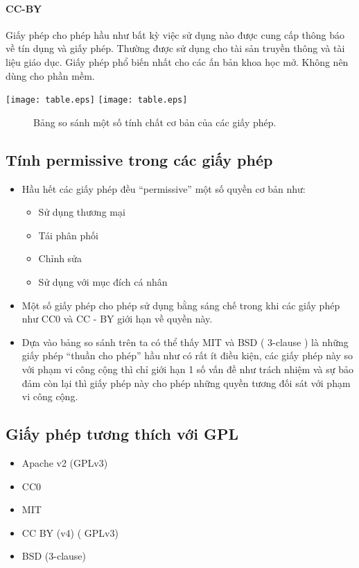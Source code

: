 \documentclass[12pt]{article}
\begin{document}
\paragraph{CC-BY}
Giấy phép cho phép hầu như bất kỳ việc sử dụng nào được cung cấp thông báo về tín dụng và giấy phép. Thường được sử dụng cho tài sản truyền thông và tài liệu giáo dục. Giấy phép phổ biến nhất cho các ấn bản khoa học mở. Không nên dùng cho phần mềm.

\begin{center}

\texttt{[image: table.eps]}
\texttt{[image: table.eps]}
\begin{figure}[!h]
\caption{Bảng so sánh một số tính chất cơ bản của các giấy phép.}
\end{figure}
\end{center}


\subsection{Tính permissive trong các giấy phép}
\begin{itemize}
\item Hầu hết các giấy phép đều “permissive” một số quyền cơ bản như:
\begin{itemize}
\item Sử dụng thương mại 
\item Tái phân phối
\item Chỉnh sửa 
\item Sử dụng với mục đích cá nhân
\end{itemize}
\item Một số giấy phép cho phép sử dụng bằng sáng chế trong khi các giấy phép như CC0 và CC - BY giới hạn về quyền này.
\item Dựa vào bảng so sánh trên ta có thể thấy MIT và BSD ( 3-clause ) là những giấy phép “thuần cho phép” hầu như có rất ít điều kiện, các giấy phép này so với phạm vi công cộng thì chỉ giới hạn 1 số vấn đề như trách nhiệm và sự bảo đảm còn lại thì giấy phép này cho phép những quyền tương đối sát với phạm vi công cộng.
\end{itemize}

\subsection{Giấy phép tương thích với GPL}
\begin{itemize}
\item Apache v2 (GPLv3)
\item CC0 
\item MIT 
\item CC BY (v4) ( GPLv3)
\item BSD (3-clause) 
\end{itemize}
\end{document}
